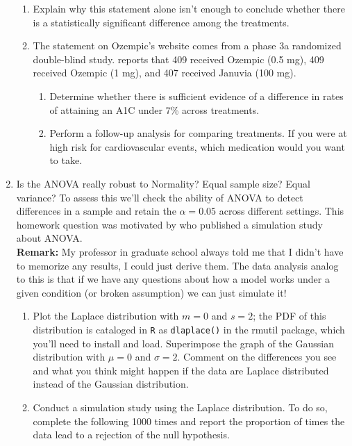 \documentclass{article}\usepackage[]{graphicx}\usepackage[]{color}
\begin{document}
\begin{enumerate}
\begin{enumerate}
\item Explain why this statement alone isn't enough to conclude whether there is a statistically 
significant difference among the treatments.
\item The statement on Ozempic's website comes from a phase 3a randomized double-blind study. 
\cite{Ahren17} reports that 409 received Ozempic (0.5 mg), 409 received Ozempic (1 mg), and 407 
received Januvia (100 mg). 
\begin{enumerate}
  \item Determine whether there is sufficient evidence of a difference in rates of attaining an 
  A1C under 7\% across treatments.
  \item Perform a follow-up analysis for comparing treatments. If you were at high risk for 
  cardiovascular events, which medication would you want to take.
\end{enumerate}
\end{enumerate}
\newpage
\item Is the ANOVA really robust to Normality? Equal sample size? Equal variance?
To assess this we'll check the ability of ANOVA to detect differences in a 
sample and retain the $\alpha=0.05$ across different settings. This homework 
question was motivated by \cite{Blanca17} who published a simulation study 
about ANOVA.\\

\textbf{Remark:} My professor in graduate school always told me that I didn't
have to memorize any results, I could just derive them. The data analysis
analog to this is that if we have any questions about how a model works
under a given condition (or broken assumption) we can just simulate it!
\begin{enumerate}
  \item Plot the Laplace distribution with $m=0$ and $s=2$; the PDF
  of this distribution is cataloged in \texttt{R} as \texttt{dlaplace()} 
  in the rmutil package, which you'll need to install and load. Superimpose
  the graph of the Gaussian distribution with $\mu=0$ and $\sigma=2$. Comment
  on the differences you see and what you think might happen if the data 
  are Laplace distributed instead of the Gaussian distribution.
  \item Conduct a simulation study using the Laplace distribution. To do so, 
  complete the following 1000 times and report the proportion of times the
  data lead to a rejection of the null hypothesis.\\
  

\end{enumerate}
\end{enumerate}
\end{document}
